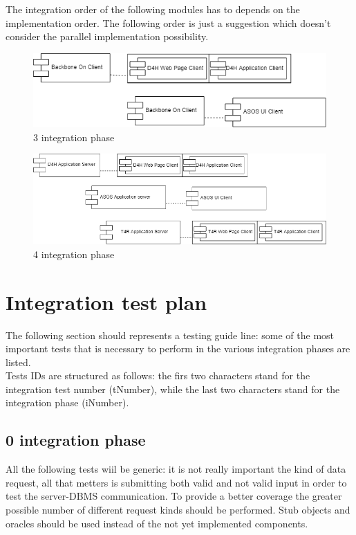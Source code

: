 The integration order of the following modules has to depends on the implementation order. The following order is just a suggestion which doesn't consider the parallel implementation possibility.
\begin{figure}[H]
\caption{3 integration phase}
\includegraphics[width = \textwidth]{sections/implementationIntegrationTestGraphs/IntegrationOrder3phase.png}
\end{figure}
\begin{figure}[H]
\caption{4 integration phase}
\includegraphics[width = \textwidth]{sections/implementationIntegrationTestGraphs/IntegrationOrder4phase.png}
\end{figure}

\section{Integration test plan}
The following section should represents  a testing guide line: some of the most important tests that is necessary to perform in the various integration phases are listed. \\
Tests IDs are structured as follows: the firs two characters stand for the integration test number (tNumber), while the last two characters stand for the  integration phase (iNumber).
\subsection{0 integration phase}

All the following tests wiil be generic: it is not really important the kind of data request, all that metters is submitting both valid and not valid input in order to test the server-DBMS communication. To provide a better coverage the greater possible number of different request kinds should be performed. Stub objects and oracles should be used instead of the not yet implemented components.

